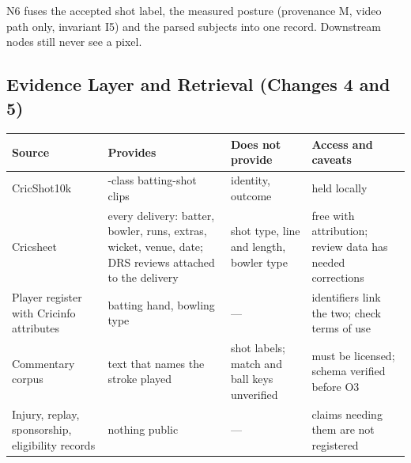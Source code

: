 \documentclass[11pt,a4paper]{article}
\begin{document}
N6 fuses the accepted shot label, the measured posture (provenance M, video path
only, invariant I5) and the parsed subjects into one record. Downstream nodes
still never see a pixel.

\subsection{Evidence Layer and Retrieval (Changes 4 and 5)}

\begin{center}
\footnotesize
\renewcommand{\arraystretch}{1.25}
\begin{tabular}{@{}>{\raggedright\arraybackslash}p{3.2cm}
                  >{\raggedright\arraybackslash}p{4.6cm}
                  >{\raggedright\arraybackslash}p{3.4cm}
                  >{\raggedright\arraybackslash}p{3.8cm}@{}}
\toprule
\textbf{Source} & \textbf{Provides} & \textbf{Does not provide} & \textbf{Access and caveats} \\
\midrule
CricShot10k \cite{cricshot10k} & 15-class batting-shot clips & identity, outcome & held locally \\
Cricsheet \cite{cricsheet} & every delivery: batter, bowler, runs, extras, wicket, venue, date; DRS reviews attached to the delivery & shot type, line and length, bowler type & free with attribution; review data has needed corrections \cite{cricsheetreview} \\
Player register with Cricinfo attributes \cite{cricketdata} & batting hand, bowling type & --- & identifiers link the two; check terms of use \\
Commentary corpus & text that names the stroke played & shot labels; match and ball keys unverified & must be licensed; schema verified before O3 \\
Injury, replay, sponsorship, eligibility records & nothing public & --- & claims needing them are not registered \\
\bottomrule
\end{tabular}
\label{tab:data}
\end{center}
\end{document}
